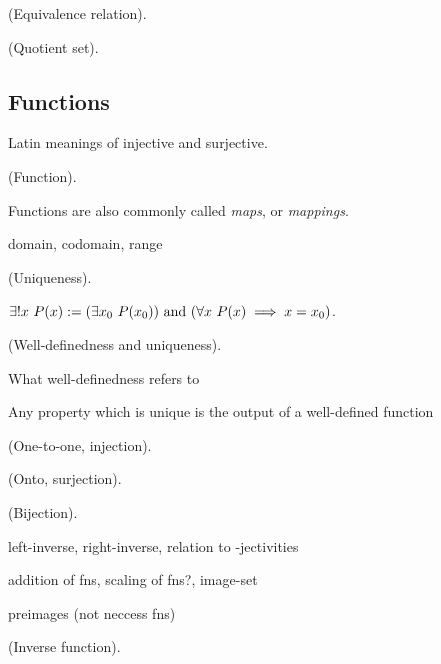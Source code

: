 \begin{defn}
    (Equivalence relation).
\end{defn}

\begin{defn}
\label{ch::logic_pf_fns::defn::quotient_set}

    (Quotient set).
\end{defn}

\subsection*{Functions}

Latin meanings of injective and surjective.

\begin{defn}
    (Function).
    
    Functions are also commonly called \textit{maps}, or \textit{mappings}.
    
    domain, codomain, range
\end{defn}

\begin{defn}
    (Uniqueness).
    
    $\exists !x \text{ } P(x) := (\exists x_0 \text{ } P(x_0)) \text{ and } (\forall x \text{ } P(x) \implies x = x_0)$.
\end{defn}

\begin{remark}
    (Well-definedness and uniqueness).
    
    What well-definedness refers to
    
    Any property which is unique is the output of a well-defined function
\end{remark}

\begin{defn}
    (One-to-one, injection).
\end{defn}

\begin{defn}
    (Onto, surjection).
\end{defn}

\begin{defn}
    (Bijection).
\end{defn}

left-inverse, right-inverse, relation to -jectivities

addition of fns, scaling of fns?, image-set

preimages (not neccess fns)

\begin{defn}
\label{ch::logic_pf_fns::defn::inverse_fn}

    (Inverse function).
\end{defn}

